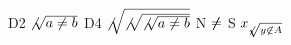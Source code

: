 D2 $\not\sqrt{a\not=b}$ D4 $\not\sqrt{\not\sqrt{\not\sqrt{a\not=b}}}$
N $\not\not=$ S $x_{\not\sqrt{y\not\in A}}$
\bye

